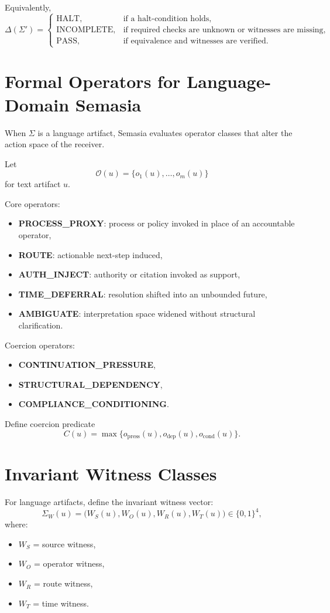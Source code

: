 \documentclass[11pt]{article}
\begin{document}
Equivalently,
\[
\Delta(\Sigma') =
\begin{cases}
\mathrm{HALT}, & \text{if a halt-condition holds},\\[4pt]
\mathrm{INCOMPLETE}, & \text{if required checks are unknown or witnesses are missing},\\[4pt]
\mathrm{PASS}, & \text{if equivalence and witnesses are verified}.
\end{cases}
\]

\section{Formal Operators for Language-Domain Semasia}

When $\Sigma$ is a language artifact, Semasia evaluates operator classes that alter the action space of the receiver.

Let
\[
\mathcal{O}(u)=\{o_1(u),\dots,o_m(u)\}
\]
for text artifact $u$.

Core operators:
\begin{itemize}[leftmargin=2em]
\item \textbf{PROCESS\_PROXY}: process or policy invoked in place of an accountable operator,
\item \textbf{ROUTE}: actionable next-step induced,
\item \textbf{AUTH\_INJECT}: authority or citation invoked as support,
\item \textbf{TIME\_DEFERRAL}: resolution shifted into an unbounded future,
\item \textbf{AMBIGUATE}: interpretation space widened without structural clarification.
\end{itemize}

Coercion operators:
\begin{itemize}[leftmargin=2em]
\item \textbf{CONTINUATION\_PRESSURE},
\item \textbf{STRUCTURAL\_DEPENDENCY},
\item \textbf{COMPLIANCE\_CONDITIONING}.
\end{itemize}

Define coercion predicate
\[
C(u)=\max\{o_{\mathrm{press}}(u),o_{\mathrm{dep}}(u),o_{\mathrm{cond}}(u)\}.
\]

\section{Invariant Witness Classes}

For language artifacts, define the invariant witness vector:
\[
\Sigma_W(u)=\bigl(W_S(u),W_O(u),W_R(u),W_T(u)\bigr)\in\{0,1\}^4,
\]
where:
\begin{itemize}[leftmargin=2em]
\item $W_S$ = source witness,
\item $W_O$ = operator witness,
\item $W_R$ = route witness,
\item $W_T$ = time witness.
\end{itemize}
\end{document}
